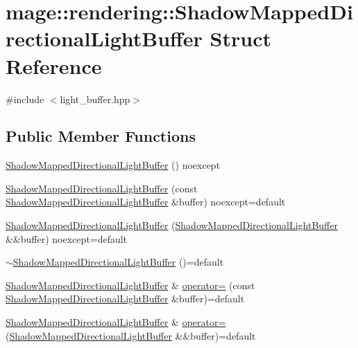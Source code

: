 \hypertarget{structmage_1_1rendering_1_1_shadow_mapped_directional_light_buffer}{}\section{mage\+:\+:rendering\+:\+:Shadow\+Mapped\+Directional\+Light\+Buffer Struct Reference}
\label{structmage_1_1rendering_1_1_shadow_mapped_directional_light_buffer}


{\ttfamily \#include $<$light\+\_\+buffer.\+hpp$>$}

\subsection*{Public Member Functions}
\begin{DoxyCompactItemize}
\item 
\hyperlink{structmage_1_1rendering_1_1_shadow_mapped_directional_light_buffer_ad3467d873a7c1b756df37458b49bf43f}{Shadow\+Mapped\+Directional\+Light\+Buffer} () noexcept
\item 
\hyperlink{structmage_1_1rendering_1_1_shadow_mapped_directional_light_buffer_a984e2af2b6319226b6e896e28fc056b8}{Shadow\+Mapped\+Directional\+Light\+Buffer} (const \hyperlink{structmage_1_1rendering_1_1_shadow_mapped_directional_light_buffer}{Shadow\+Mapped\+Directional\+Light\+Buffer} \&buffer) noexcept=default
\item 
\hyperlink{structmage_1_1rendering_1_1_shadow_mapped_directional_light_buffer_a35a9ceeb8616a77cf263769f0526db28}{Shadow\+Mapped\+Directional\+Light\+Buffer} (\hyperlink{structmage_1_1rendering_1_1_shadow_mapped_directional_light_buffer}{Shadow\+Mapped\+Directional\+Light\+Buffer} \&\&buffer) noexcept=default
\item 
\hyperlink{structmage_1_1rendering_1_1_shadow_mapped_directional_light_buffer_a5566778f8ff3351b7e37240fe8a3dbf1}{$\sim$\+Shadow\+Mapped\+Directional\+Light\+Buffer} ()=default
\item 
\hyperlink{structmage_1_1rendering_1_1_shadow_mapped_directional_light_buffer}{Shadow\+Mapped\+Directional\+Light\+Buffer} \& \hyperlink{structmage_1_1rendering_1_1_shadow_mapped_directional_light_buffer_ab124ed92e958ec42786045e1c235f54b}{operator=} (const \hyperlink{structmage_1_1rendering_1_1_shadow_mapped_directional_light_buffer}{Shadow\+Mapped\+Directional\+Light\+Buffer} \&buffer)=default
\item 
\hyperlink{structmage_1_1rendering_1_1_shadow_mapped_directional_light_buffer}{Shadow\+Mapped\+Directional\+Light\+Buffer} \& \hyperlink{structmage_1_1rendering_1_1_shadow_mapped_directional_light_buffer_a85fdaabbf857d35be6874e94de4aa86e}{operator=} (\hyperlink{structmage_1_1rendering_1_1_shadow_mapped_directional_light_buffer}{Shadow\+Mapped\+Directional\+Light\+Buffer} \&\&buffer)=default
\end{DoxyCompactItemize}
